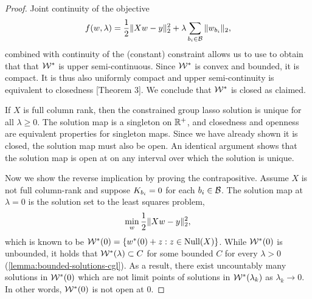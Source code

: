 \mapContinuityCGL*
\begin{proof}
	Joint continuity of the objective
	\[
		f(w, \lambda) = \frac 1 2 \|X w - y\|_2^2 + \lambda \sum_{b_i \in \mathcal{B}} \|w_{b_i}\|_2,
	\]
	combined with continuity of the (constant) constraint allows us to use
	\citet[Theorem 1]{robinson1974sufficient} to obtain that
	that \( \mathcal{W}^* \) is upper semi-continuous.
	Since \( \mathcal{W}^* \) is convex and bounded, it is compact.
	It is thus also uniformly compact and upper semi-continuity is
	equivalent to closedness \citep{hogan1973point}[Theorem 3].
	We conclude that \( \mathcal{W}^* \) is closed as claimed.

	If \( X \) is full column rank, then the constrained group
	lasso solution is unique for all \( \lambda \geq 0 \).
	The solution map is a singleton on \( \mathbb{R}^+ \), and closedness
	and openness are equivalent properties for singleton maps.
	Since we have already shown it is closed, the solution map
	must also be open.
	An identical argument shows that the solution map is open
	at on any interval over which the solution is unique.

	Now we show the reverse implication by proving the contrapositive.
	Assume \( X \) is not full column-rank and suppose \( K_{{b_i}} = 0 \)
	for each \( {b_i} \in \mathcal{B} \).
	The solution map at \( \lambda = 0 \) is the solution set to
	the least squares problem,
	\[
		\min_w \frac 1 2 \|X w - y\|_2^2,
	\]
	which is known to be \( \mathcal{W}^*(0) = \left\{w^*(0) + z : z \in \text{Null}(X)\right\} \).
	While \( \mathcal{W}^*(0) \) is unbounded, it holds that
	\( \mathcal{W}^*(\lambda) \subset C \) for some bounded \( C \) for
	every \( \lambda > 0 \) (\cref{lemma:bounded-solutions-cgl}).
	As a result, there exist uncountably many solutions in \( \mathcal{W}^*(0) \)
	which are not limit points of solutions in \( \mathcal{W}^*(\lambda_k) \)
	as \( \lambda_k \rightarrow 0 \).
	In other words, \( \mathcal{W}^*(0) \) is not open at \( 0 \).
\end{proof}


